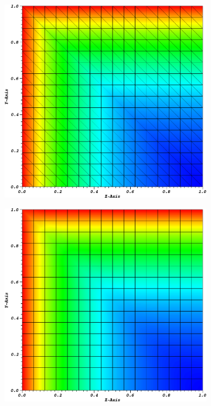 \begin{figure}
\centering
{
	\begin{subfigure}[b]{0.485\textwidth}
		\centering
		\label{subfig::PA_Mesh_Tri}
		\includegraphics[width=\textwidth]{figures/sec_BF/PALeftTopSol_Tri.png}
	\end{subfigure}
	\hfill
	\begin{subfigure}[b]{0.485\textwidth}
		\centering
		\label{subfig::PA_Mesh_Cart}
		\includegraphics[width=\textwidth]{figures/sec_BF/PALeftTopSol_Cart.png}

\end{subfigure}}
\end{figure}
